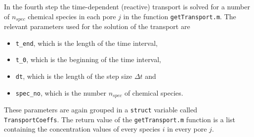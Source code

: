 \documentclass[12pt]{report}
\begin{document}
In the fourth step the time-dependent (reactive) transport is solved for a number of $n_{spec}$ chemical species in each pore $j$ in the function {\tt getTransport.m}. The relevant parameters used for the solution of the transport are

\begin{itemize}
	\item {\tt t\_end}, which is the length of the time interval,
	\item {\tt t\_0}, which is the beginning of the time interval,
	\item {\tt dt}, which is the length of the step size $\Delta t$ and
	\item {\tt spec\_no}, which is the number $n_{spec}$ of chemical species.
\end{itemize}

These parameters are again grouped in a {\tt struct} variable called {\tt TransportCoeffs}. The return value of the {\tt getTransport.m} function is a list containing the concentration values of every species $i$ in every pore $j$.
\end{document}
